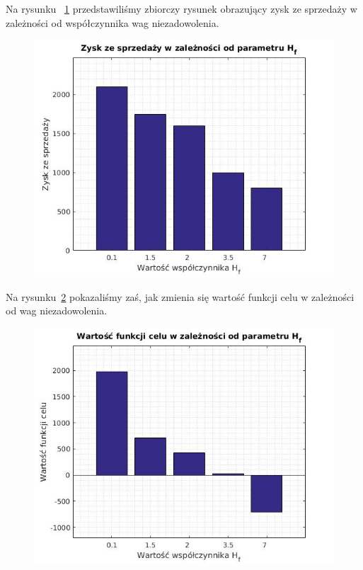 \documentclass[]{article}
\begin{document}
Na rysunku ~\ref{fig:zysk} przedstawiliśmy zbiorczy rysunek obrazujący zysk ze sprzedaży w zależności od współczynnika wag niezadowolenia.

\begin{figure}
\centering
\includegraphics[width=0.7\linewidth]{zysk}
\caption{}
\label{fig:zysk}
\end{figure}

Na rysunku~\ref{fig:fcja_celu} pokazaliśmy zaś, jak zmienia się wartość funkcji celu w zależności od wag niezadowolenia.

\begin{figure}
\centering
\includegraphics[width=0.7\linewidth]{fcja_celu}
\caption{}
\label{fig:fcja_celu}
\end{figure}
\end{document}
